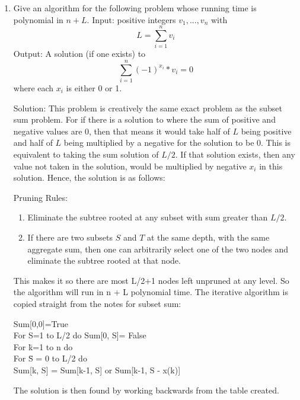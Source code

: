 \documentclass{article}
\begin{document}
\begin{enumerate}
\begin{enumerate}
\begin{tabbing}
\end{tabbing}
\end{enumerate}


\setcounter{enumi}{13}
\item Give an algorithm for the following problem whose running time is polynomial in $n+L.$
\newline  Input: positive integers $v_{1},...,v_{n}$ with $$L=\sum\limits_{i=1}^{n}v_{i}$$
\newline Output: A solution (if one exists) to $$\sum\limits_{i=1}^{n}(-1)^{x_{i}}*v_{i} = 0$$ where each $x_{i}$ is either 0 or 1.

Solution: This problem is creatively the same exact problem as the subset sum problem. For if there is a solution to where the sum of positive and negative values are 0, then that means it would take half of $L$ being positive and half of $L$ being multiplied by a negative for the solution to be 0. This is equivalent to taking the sum solution of $L/2$. If that solution exists, then any value not taken in the solution, would be multiplied by negative $x_{i}$ in this solution. Hence, the solution is as follows: 

Pruning Rules: 
\begin{enumerate}
\item Eliminate the subtree rooted at any subset with sum greater than $L/2$.
\item If there are two subsets $S$ and $T$ at the same depth, with the same aggregate sum, then one can arbitrarily select one of the two nodes and eliminate the subtree rooted at that node.
\end{enumerate}
This makes it so there are most L/2+1 nodes left unpruned at any level. So the algorithm will run in n + L polynomial time. The iterative algorithm is copied straight from the notes for subset sum:

\begin{tabbing}
Sum[0,0]=True\\
For S=1 to L/2 do Sum[0, S]= False\\

For \=k=1 to n do\\
\>	For \=S = 0 to L/2 do\\
\>\>	Sum[k, S] = Sum[k-1, S] or Sum[k-1, S - x(k)]\\
\end{tabbing}
The solution is then found by working backwards from the table created.


\end{enumerate}
\end{document}
